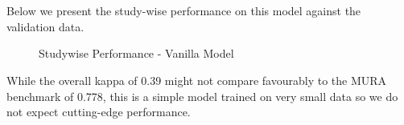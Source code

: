 \documentclass[11pt]{article} %
\theoremstyle{plain}
\theoremstyle{definition}
\begin{document}
\\
\\
\noindent
Below we present the study-wise performance on this model against the validation data.
\begin{figure}[!ht]
\centering
{}
\caption{Studywise Performance - Vanilla Model}
\label{fig:Results_Vanilla_Studywise}
\end{figure}
\FloatBarrier
\noindent
While the overall kappa of 0.39 might not compare favourably to the MURA benchmark of 0.778, this is a simple model trained on very small data so we do not expect cutting-edge performance.
\end{document}
